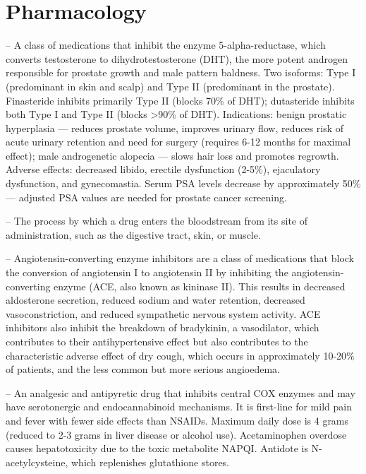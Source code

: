 \chapter{Pharmacology}

-- A class of medications that inhibit the enzyme 5-alpha-reductase, which converts testosterone to dihydrotestosterone (DHT), the more potent androgen responsible for prostate growth and male pattern baldness. Two isoforms: Type I (predominant in skin and scalp) and Type II (predominant in the prostate). Finasteride inhibits primarily Type II (blocks 70\% of DHT); dutasteride inhibits both Type I and Type II (blocks >90\% of DHT). Indications: benign prostatic hyperplasia — reduces prostate volume, improves urinary flow, reduces risk of acute urinary retention and need for surgery (requires 6-12 months for maximal effect); male androgenetic alopecia — slows hair loss and promotes regrowth. Adverse effects: decreased libido, erectile dysfunction (2-5\%), ejaculatory dysfunction, and gynecomastia. Serum PSA levels decrease by approximately 50\% — adjusted PSA values are needed for prostate cancer screening.

-- The process by which a drug enters the bloodstream from its site of administration, such as the digestive tract, skin, or muscle.

-- Angiotensin-converting enzyme inhibitors are a class of medications that block the conversion of angiotensin I to angiotensin II by inhibiting the angiotensin-converting enzyme (ACE, also known as kininase II). This results in decreased aldosterone secretion, reduced sodium and water retention, decreased vasoconstriction, and reduced sympathetic nervous system activity. ACE inhibitors also inhibit the breakdown of bradykinin, a vasodilator, which contributes to their antihypertensive effect but also contributes to the characteristic adverse effect of dry cough, which occurs in approximately 10-20\% of patients, and the less common but more serious angioedema.

-- An analgesic and antipyretic drug that inhibits central COX enzymes and may have serotonergic and endocannabinoid mechanisms. It is first-line for mild pain and fever with fewer side effects than NSAIDs. Maximum daily dose is 4 grams (reduced to 2-3 grams in liver disease or alcohol use). Acetaminophen overdose causes hepatotoxicity due to the toxic metabolite NAPQI. Antidote is N-acetylcysteine, which replenishes glutathione stores.

